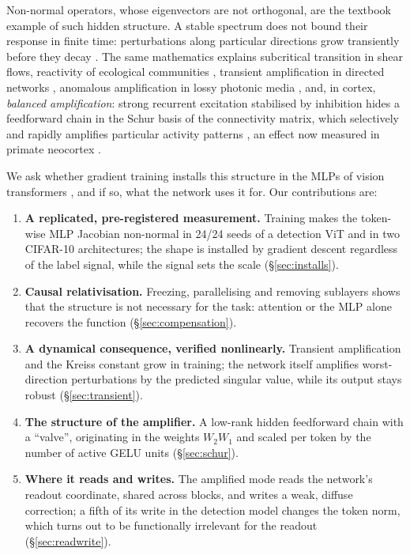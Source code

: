 \documentclass[10pt]{article}
\begin{document}
Non-normal operators, whose eigenvectors are not orthogonal, are the textbook example of such hidden structure. A stable spectrum does
not bound their response in finite time: perturbations along particular directions grow transiently before they decay
\citep{trefethen1993hydrodynamic,trefethen2005spectra,schmid2007nonmodal}. The same mathematics explains subcritical transition in shear
flows, reactivity of ecological communities \citep{neubert1997alternatives}, transient amplification in directed networks
\citep{asllani2018structure}, anomalous amplification in lossy photonic media \citep{makris2014anomalous}, and, in cortex,
\emph{balanced amplification}: strong recurrent excitation stabilised by inhibition hides a feedforward chain in the Schur basis of the
connectivity matrix, which selectively and rapidly amplifies particular activity patterns \citep{murphy2009balanced,hennequin2012nonnormal,
hennequin2014optimal}, an effect now measured in primate neocortex \citep{pattadkal2023primate}.

We ask whether gradient training installs this structure in the MLPs of vision transformers \citep{dosovitskiy2021image}, and if so, what
the network uses it for. Our
contributions are:
\begin{enumerate}
\item \textbf{A replicated, pre-registered measurement.} Training makes the token-wise MLP Jacobian non-normal in 24/24 seeds of a detection
  ViT and in two CIFAR-10 architectures; the shape is installed by gradient descent regardless of the label signal, while the signal
  sets the scale (\S\ref{sec:installs}).
\item \textbf{Causal relativisation.} Freezing, parallelising and removing sublayers shows that the structure is not necessary for the task:
  attention or the MLP alone recovers the function (\S\ref{sec:compensation}).
\item \textbf{A dynamical consequence, verified nonlinearly.} Transient amplification and the Kreiss constant grow in training; the
  network itself amplifies worst-direction perturbations by the predicted singular value, while its output stays robust
  (\S\ref{sec:transient}).
\item \textbf{The structure of the amplifier.} A low-rank hidden feedforward chain with a ``valve'', originating in the weights $W_2W_1$ and
  scaled per token by the number of active GELU units (\S\ref{sec:schur}).
\item \textbf{Where it reads and writes.} The amplified mode reads the network's readout coordinate, shared across blocks, and writes
  a weak, diffuse correction; a fifth of its write in the detection model changes the token norm, which turns out to be functionally
  irrelevant for the readout (\S\ref{sec:readwrite}).
\end{enumerate}
\end{document}
